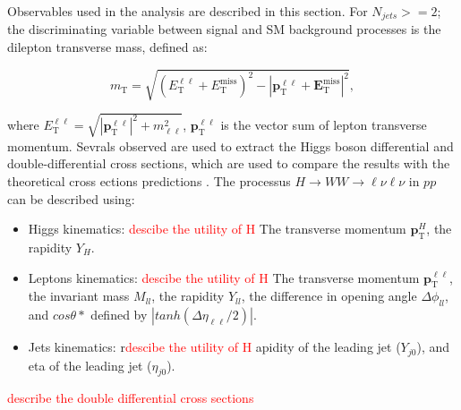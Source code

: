 Observables used in the analysis are described in this section. For $N_{jets} >= 2$; the discriminating variable between signal and SM background processes is the dilepton transverse mass, defined as:

\begin{equation}
m_{\mathrm{T}}=\sqrt{\left(E_{\mathrm{T}}^{\ell \ell}+E_{\mathrm{T}}^{\mathrm{miss}}\right)^{2}-\left|\boldsymbol{p}_{\mathrm{T}}^{\ell \ell}+\boldsymbol{E}_{\mathrm{T}}^{\mathrm{miss}}\right|^{2}},
\end{equation}

where $E_{\mathrm{T}}^{\ell \ell}=\sqrt{\left|\boldsymbol{p}_{\mathrm{T}}^{\ell \ell}\right|^{2}+m_{\ell \ell}^{2}}$, $\boldsymbol{p}_{\mathrm{T}}^{\ell \ell}$ is the vector sum of lepton transverse momentum. Sevrals observed are used to extract the Higgs boson differential and double-differential cross sections, which are used to compare the results with the theoretical cross ections predictions \cite{20131}. The processus $ H \rightarrow WW \rightarrow \ell \nu \ell \nu$ in $pp$ can be described using:

\begin{itemize}
\item Higgs kinematics: \textcolor{red}{descibe the utility of H} The transverse momentum $\boldsymbol{p}_{\mathrm{T}}^{H}$, the rapidity $Y_{H}$.
\item Leptons kinematics: \textcolor{red}{descibe the utility of H} The transverse momentum $\boldsymbol{p}_{\mathrm{T}}^{\ell \ell}$, the invariant mass $M_{ll}$, the rapidity $Y_{ll}$, the difference in opening angle $\Delta \phi_{ll}$, and  $cos \theta{*}$ defined by $|tanh(\Delta \eta_{\ell\ell}/2)|$.
\item Jets kinematics:  r\textcolor{red}{descibe the utility of H} apidity of the leading jet ($Y_{j0}$), and eta of the leading jet ($\eta_{j0}$).
\end{itemize}



\textcolor{red}{describe the double differential cross sections}




